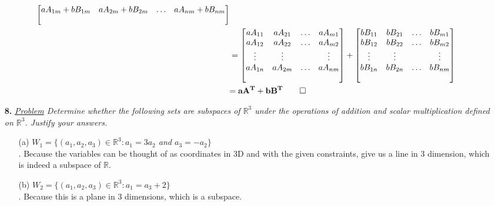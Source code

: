 \documentclass[11pt, fleqn]{article}
\begin{document}
\begin{itemize}
\begin{align*}
\begin{bmatrix}
	                aA_{1m} + bB_{1m} & aA_{2m} + bB_{2m} & \hdots & aA_{nm} + bB_{nm}\\
	                \nonumber
	            \end{bmatrix}\\
	            &=\begin{bmatrix}
	                aA_{11} & aA_{21} & \hdots & aA_{m1}\\
	                aA_{12} & aA_{22} & \hdots & aA_{m2}\\
	                \vdots & \vdots &  & \vdots\\
	                aA_{1n} & aA_{2m} & \hdots & aA_{nm}\\
	                \nonumber
	            \end{bmatrix} +
	            \begin{bmatrix}
	                bB_{11} & bB_{21} & \hdots & bB_{m1}\\
	                bB_{12} & bB_{22} & \hdots & bB_{m2}\\
	                \vdots & \vdots &  & \vdots\\
	                bB_{1n} & bB_{2n} & \hdots & bB_{nm}\\
	                \nonumber
	            \end{bmatrix}\\
	            &\mathbf{=\;}\mathbf{aA^T + bB^T} \qed
        \end{align*}


    \item [\textbf{8.}] \textit{\underline{Problem} Determine whether the following sets are subspaces of $\mathbb{R}^3$ under the operations of addition and scalar multiplication defined on $\mathbb{R}^3$. Justify your answers.}
		\begin{itemize}
            \item[(a)]\textit{$W_1 = \{(a_1, a_2, a_3)\in \mathbb{R}^3: a_1 = 3a_2$ and $a_3 = -a_2\}$}\\[1ex]. Because the variables can be thought of as coordinates in 3D and with the given constraints, give us a line in 3 dimension, which is indeed a subspace of $\mathbb{R}$.

    		\item[(b)] \textit{$W_2 = \{(a_1, a_2, a_3)\in \mathbb{R}^3: a_1=a_3 + 2\}$}\\[1ex]. Because this is a plane in 3 dimensions, which is a subspace.


\end{itemize}
\end{itemize}
\end{document}
